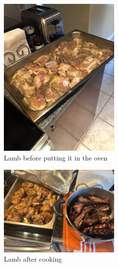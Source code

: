 \begin{figure}
  \includegraphics[width=60mm]{monanteras/images/Lamb.jpg}
  \caption{Lamb before putting it in the oven}
\end{figure}
\begin{figure}
  \includegraphics[width=60mm]{monanteras/images/Lamb 2.jpg}
  \caption{Lamb after cooking}
\end{figure}
